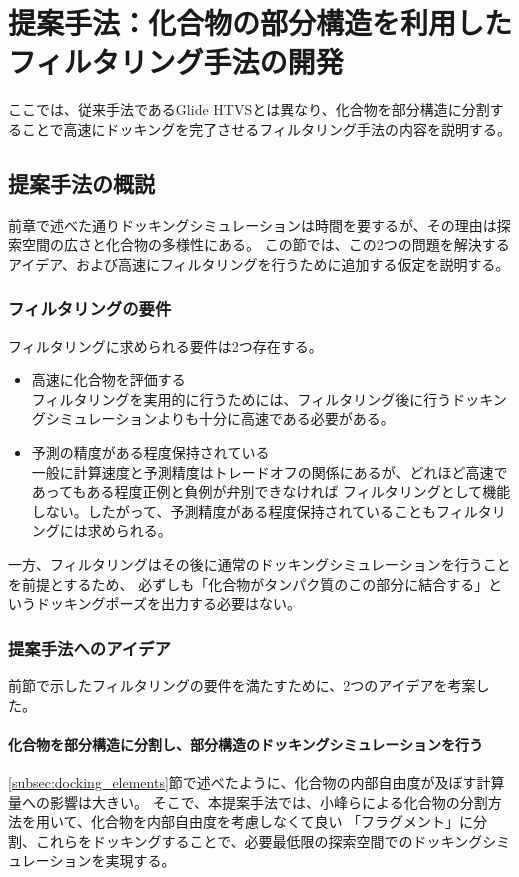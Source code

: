 \chapter{提案手法：化合物の部分構造を利用したフィルタリング手法の開発}
ここでは、従来手法であるGlide HTVSとは異なり、化合物を部分構造に分割することで高速にドッキングを完了させるフィルタリング手法の内容を説明する。

\section{提案手法の概説}
前章で述べた通りドッキングシミュレーションは時間を要するが、その理由は探索空間の広さと化合物の多様性にある。
この節では、この2つの問題を解決するアイデア、および高速にフィルタリングを行うために追加する仮定を説明する。

\subsection{フィルタリングの要件}\label{subsec}
フィルタリングに求められる要件は2つ存在する。
\begin{itemize}
\item 高速に化合物を評価する\\
	フィルタリングを実用的に行うためには、フィルタリング後に行うドッキングシミュレーションよりも十分に高速である必要がある。
\item 予測の精度がある程度保持されている\\
	一般に計算速度と予測精度はトレードオフの関係にあるが、どれほど高速であってもある程度正例と負例が弁別できなければ
	フィルタリングとして機能しない。したがって、予測精度がある程度保持されていることもフィルタリングには求められる。
\end{itemize}
一方、フィルタリングはその後に通常のドッキングシミュレーションを行うことを前提とするため、
必ずしも「化合物がタンパク質のこの部分に結合する」というドッキングポーズを出力する必要はない。

\subsection{提案手法へのアイデア}\label{subsec:idea}
前節で示したフィルタリングの要件を満たすために、2つのアイデアを考案した。

\subsubsection{化合物を部分構造に分割し、部分構造のドッキングシミュレーションを行う}
\ref{subsec:docking_elements}節で述べたように、化合物の内部自由度が及ぼす計算量への影響は大きい。
そこで、本提案手法では、小峰ら\cite{Shunta2015}による化合物の分割方法を用いて、化合物を内部自由度を考慮しなくて良い
「フラグメント」に分割、これらをドッキングすることで、必要最低限の探索空間でのドッキングシミュレーションを実現する。

